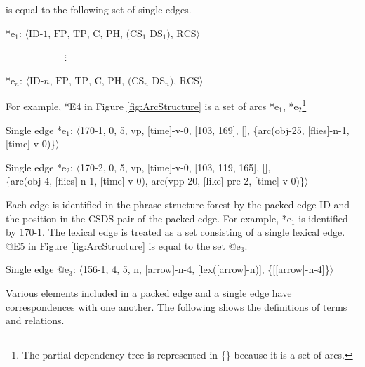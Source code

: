 \documentclass[english]{jnlp_1.4_rep}
\theoremstyle{break}
\theoremstyle{plain}
\theoremstyle{plain}
\begin{document}
\noindent
is equal to the following set of single edges.

*e$_1$: $\langle\text{ID-1, FP, TP, C, PH, (CS$_1$ DS$_1$), RCS}\rangle$

　　　　　　$\vdots$

*e$_n$: $\langle\text{ID-$n$, FP, TP, C, PH, (CS$_n$ DS$_n$), RCS}\rangle$

\noindent
For example, *E4 in Figure \ref{fig:ArcStructure} is a set
of arcs *e$_1$, *e$_2$\footnote{The partial dependency tree is
  represented in \{\} because it is a set of arcs.}

Single edge *e$_1$: $\langle$170-1, 0, 5, vp, [time]-v-0, [103, 169], [],
 \{arc(obj-25, [flies]-n-1, [time]-v-0)\}$\rangle$

Single edge *e$_2$: $\langle$170-2, 0, 5, vp, [time]-v-0, [103, 119, 165], [],\\
\space{8em}\{arc(obj-4, [flies]-n-1, [time]-v-0), arc(vpp-20, [like]-pre-2, [time]-v-0)\}$\rangle$

\noindent
Each edge is identified in the phrase structure forest by
the packed edge-ID and the position in the CSDS pair of the packed
edge. For example, *e$_1$ is identified by 170-1. The lexical edge is
treated as a set consisting of a single lexical edge. @E5 in
Figure \ref{fig:ArcStructure} is equal to the set {@e$_3$}.

Single edge @e$_3$: $\langle$156-1, 4, 5, n, [arrow]-n-4, [lex([arrow]-n)], \{[[arrow]-n-4]\}$\rangle$

\noindent
Various elements included in a packed edge and a single
edge have correspondences with one another. The following shows the
definitions of terms and relations.
\end{document}
